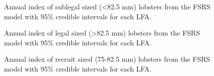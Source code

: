 \documentclass[11pt]{article}
\newcommand{\ebh}{\string~/bio.data/bio.lobster/figures/LFA3438Framework2019/} %
\begin{document}

    \begin{figure}
    \centering
        \caption{Annual index of sublegal sized (\textless 82.5 mm) lobsters from the FSRS model with 95\% credible intervals for each LFA.}

    \end{figure}


    \begin{figure}
    \centering
        \caption{Annual index of legal sized (\textgreater 82.5 mm) lobsters from the FSRS model with 95\% credible intervals for each LFA.}

    \end{figure}


    \begin{figure}
    \centering
        \caption{Annual index of recruit sized (75-82.5 mm) lobsters from the FSRS model with 95\% credible intervals for each LFA.}

    \end{figure}





\end{document}
